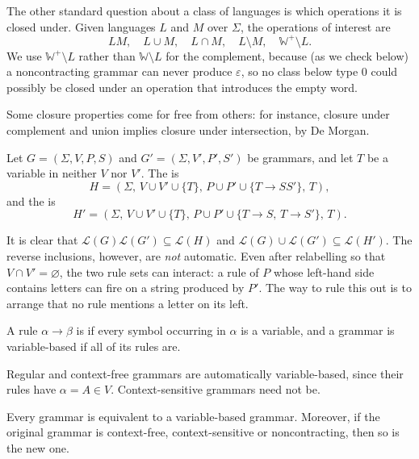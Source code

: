\documentclass[a4paper]{scrartcl}
\newcommand{\WW}{\mathbb{W}}
\newcommand{\lang}{\mathcal{L}}
\newcommand{\eps}{\varepsilon}
\begin{document}
The other standard question about a class of languages is which operations it is closed under. Given languages $L$ and $M$ over $\Sigma$, the operations of interest are
$$LM, \quad L \cup M, \quad L \cap M, \quad L \setminus M, \quad \WW^+ \setminus L.$$
We use $\WW^+ \setminus L$ rather than $\WW \setminus L$ for the complement, because (as we check below) a noncontracting grammar can never produce $\eps$, so no class below type 0 could possibly be closed under an operation that introduces the empty word.

Some closure properties come for free from others: for instance, closure under complement and union implies closure under intersection, by De Morgan.

\begin{definition}
	Let $G = (\Sigma, V, P, S)$ and $G' = (\Sigma, V', P', S')$ be grammars, and let $T$ be a variable in neither $V$ nor $V'$. The  is
	$$H = (\Sigma,\, V \cup V' \cup \{T\},\, P \cup P' \cup \{T \to SS'\},\, T),$$
	and the  is
	$$H' = (\Sigma,\, V \cup V' \cup \{T\},\, P \cup P' \cup \{T \to S,\, T \to S'\},\, T).$$
\end{definition}

It is clear that $\lang(G)\lang(G') \subseteq \lang(H)$ and $\lang(G) \cup \lang(G') \subseteq \lang(H')$. The reverse inclusions, however, are \emph{not} automatic. Even after relabelling so that $V \cap V' = \varnothing$, the two rule sets can interact: a rule of $P$ whose left-hand side contains letters can fire on a string produced by $P'$. The way to rule this out is to arrange that no rule mentions a letter on its left.

\begin{definition}
	A rule $\alpha \to \beta$ is  if every symbol occurring in $\alpha$ is a variable, and a grammar is variable-based if all of its rules are.
\end{definition}

Regular and context-free grammars are automatically variable-based, since their rules have $\alpha = A \in V$. Context-sensitive grammars need not be.

\begin{lemma}\label{lem:variablebased}
	Every grammar is equivalent to a variable-based grammar. Moreover, if the original grammar is context-free, context-sensitive or noncontracting, then so is the new one.
\end{lemma}
\end{document}
